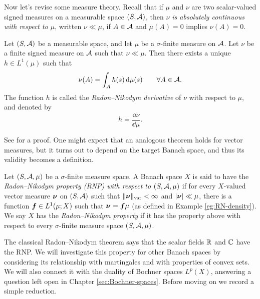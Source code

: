 Now let's revise some measure theory.
Recall that if $\mu$ and $\nu$ are two scalar-valued signed measures on a measurable space $(S,\mathcal{A})$, then \emph{$\nu$ is absolutely continuous with respect to $\mu$}, written $\nu \ll \mu$, if $A \in \mathcal{A}$ and $\mu(A) = 0$ implies $\nu(A) = 0$.

\begin{thm}
  Let $(S,\mathcal{A})$ be a measurable space, and let $\mu$ be a $\sigma$-finite measure on $\mathcal{A}$.
  Let $\nu$ be a finite signed measure on $\mathcal{A}$ such that $\nu \ll \mu$.
  Then there exists a unique $h \in L^1(\mu)$ such that
  \begin{equation*}
    \nu(A) = \int_{A} h(s) \, \mathrm{d}\mu(s) \qquad \forall A \in \mathcal{A}.
  \end{equation*}
  The function $h$ is called the \emph{Radon--Nikodym derivative} of $\nu$ with respect to $\mu$, and denoted by
  \begin{equation*}
    h = \frac{\dd\nu}{\dd\mu}.
  \end{equation*}
\end{thm}

See \cite[Theorem 5.5.4]{rD04} for a proof.
One might expect that an analogous theorem holds for vector measures, but it turns out to depend on the target Banach space, and thus its validity becomes a definition.

\begin{defn}
  Let $(S,\mathcal{A},\mu)$ be a $\sigma$-finite measure space.
  A Banach space $X$ is said to have the \emph{Radon--Nikodym property (RNP) with respect to $(S,\mathcal{A},\mu)$} if for every $X$-valued vector measure $\bm{\nu}$ on $(S,\mathcal{A})$ such that $\|\bm{\nu}\|_{\mathrm{var}} < \infty$ and $|\bm{\nu}| \ll \mu$, there is a function $\bm{f} \in L^1(\mu;X)$ such that $\bm{\nu} = \bm{f}\mu$ (as defined in Example \ref{eg:RN-density}).
  We say $X$ has the \emph{Radon--Nikodym property} if it has the property above with respect to every $\sigma$-finite measure space $(S,\mathcal{A},\mu)$.
\end{defn}

The classical Radon--Nikodym theorem says that the scalar fields $\mathbb{R}$ and $\mathbb{C}$ have the RNP.
We will investigate this property for other Banach spaces by considering its relationship with martingales and with properties of convex sets.
We will also connect it with the duality of Bochner spaces $L^p(X)$, answering a question left open in Chapter \ref{sec:Bochner-spaces}.
Before moving on we record a simple reduction.

